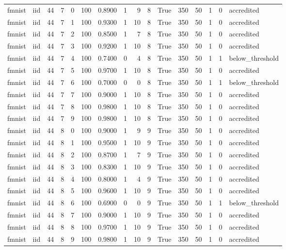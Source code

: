 \begin{tabular}{llrrrrrrrrrrrrrl}
fmnist & iid & 44 & 7 & 0 & 100 & 0.8900 & 1 & 9 & 8 & True & 350 & 50 & 1 & 0 & accredited \\
fmnist & iid & 44 & 7 & 1 & 100 & 0.9300 & 1 & 10 & 8 & True & 350 & 50 & 1 & 0 & accredited \\
fmnist & iid & 44 & 7 & 2 & 100 & 0.8500 & 1 & 7 & 8 & True & 350 & 50 & 1 & 0 & accredited \\
fmnist & iid & 44 & 7 & 3 & 100 & 0.9200 & 1 & 10 & 8 & True & 350 & 50 & 1 & 0 & accredited \\
fmnist & iid & 44 & 7 & 4 & 100 & 0.7400 & 0 & 4 & 8 & True & 350 & 50 & 1 & 1 & below\_threshold \\
fmnist & iid & 44 & 7 & 5 & 100 & 0.9700 & 1 & 10 & 8 & True & 350 & 50 & 1 & 0 & accredited \\
fmnist & iid & 44 & 7 & 6 & 100 & 0.7000 & 0 & 0 & 8 & True & 350 & 50 & 1 & 1 & below\_threshold \\
fmnist & iid & 44 & 7 & 7 & 100 & 0.9000 & 1 & 10 & 8 & True & 350 & 50 & 1 & 0 & accredited \\
fmnist & iid & 44 & 7 & 8 & 100 & 0.9800 & 1 & 10 & 8 & True & 350 & 50 & 1 & 0 & accredited \\
fmnist & iid & 44 & 7 & 9 & 100 & 0.9800 & 1 & 10 & 8 & True & 350 & 50 & 1 & 0 & accredited \\
fmnist & iid & 44 & 8 & 0 & 100 & 0.9000 & 1 & 9 & 9 & True & 350 & 50 & 1 & 0 & accredited \\
fmnist & iid & 44 & 8 & 1 & 100 & 0.9500 & 1 & 10 & 9 & True & 350 & 50 & 1 & 0 & accredited \\
fmnist & iid & 44 & 8 & 2 & 100 & 0.8700 & 1 & 7 & 9 & True & 350 & 50 & 1 & 0 & accredited \\
fmnist & iid & 44 & 8 & 3 & 100 & 0.8300 & 1 & 10 & 9 & True & 350 & 50 & 1 & 0 & accredited \\
fmnist & iid & 44 & 8 & 4 & 100 & 0.8000 & 1 & 4 & 9 & True & 350 & 50 & 1 & 0 & accredited \\
fmnist & iid & 44 & 8 & 5 & 100 & 0.9600 & 1 & 10 & 9 & True & 350 & 50 & 1 & 0 & accredited \\
fmnist & iid & 44 & 8 & 6 & 100 & 0.6900 & 0 & 0 & 9 & True & 350 & 50 & 1 & 1 & below\_threshold \\
fmnist & iid & 44 & 8 & 7 & 100 & 0.9000 & 1 & 10 & 9 & True & 350 & 50 & 1 & 0 & accredited \\
fmnist & iid & 44 & 8 & 8 & 100 & 0.9700 & 1 & 10 & 9 & True & 350 & 50 & 1 & 0 & accredited \\
fmnist & iid & 44 & 8 & 9 & 100 & 0.9800 & 1 & 10 & 9 & True & 350 & 50 & 1 & 0 & accredited \\

\end{tabular}
